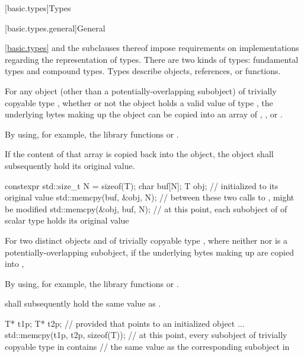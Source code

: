 [basic.types]{Types}%

[basic.types.general]{General}%

\pnum
\begin{note}
\ref{basic.types} and the subclauses thereof
impose requirements on implementations regarding the representation
of types.
There are two kinds of types: fundamental types and compound types.
Types describe objects,
references,
or functions.
\end{note}

\pnum
{}%
%
For any object (other than a potentially-overlapping subobject) of trivially copyable type
, whether or not the object holds a valid value of type
, the underlying bytes making up the
object can be copied into an array of
,
, or
.
\begin{footnote}
By using, for example, the library
functions  or .
\end{footnote}
If the content of that array
is copied back into the object, the object shall
subsequently hold its original value.
\begin{example}
\begin{codeblock}
constexpr std::size_t N = sizeof(T);
char buf[N];
T obj;                          //  initialized to its original value
std::memcpy(buf, &obj, N);      // between these two calls to ,  might be modified
std::memcpy(&obj, buf, N);      // at this point, each subobject of  of scalar type holds its original value
\end{codeblock}
\end{example}

\pnum
For two distinct objects  and 
of trivially copyable type ,
where neither  nor  is a potentially-overlapping subobject,
if the underlying bytes making up
 are copied into ,
\begin{footnote}
By using, for example,
the library functions  or .
\end{footnote}
  shall subsequently hold the same value as
.
\begin{example}
\begin{codeblock}
T* t1p;
T* t2p;
    // provided that  points to an initialized object ...
std::memcpy(t1p, t2p, sizeof(T));
    // at this point, every subobject of trivially copyable type in  contains
    // the same value as the corresponding subobject in 
\end{codeblock}
\end{example}

